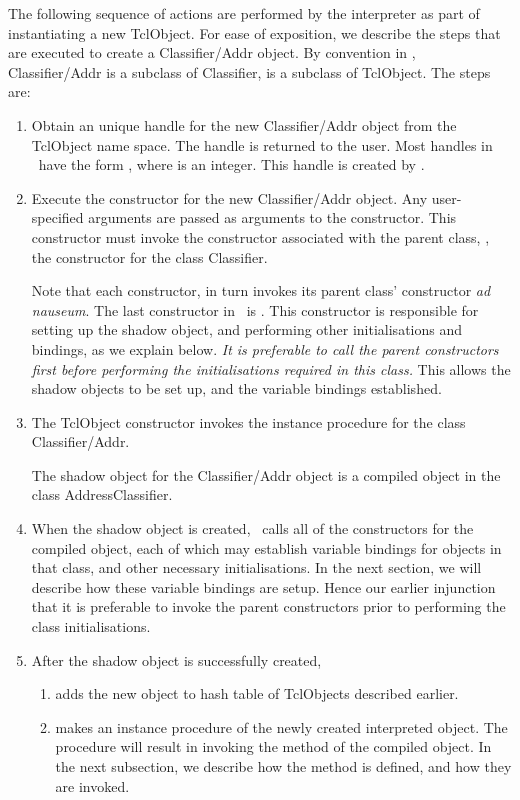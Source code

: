 \documentclass{article}
\begin{document}
The following sequence of actions are performed by the interpreter
as part of instantiating a new TclObject.
For ease of exposition, we describe the steps that are executed
to create a Classifier/Addr object.
By convention in \ns, Classifier/Addr is a subclass of Classifier, 
is a subclass of TclObject.
The steps are:
\begin{enumerate}
\item
  Obtain an unique handle for the new Classifier/Addr object
  from the TclObject name space.
  The handle is returned to the user.
  Most handles in \ns\ have the form , where 
  is an integer.  This handle is created by
  .
\item Execute the constructor for the new Classifier/Addr object.
  Any user-specified arguments are passed as arguments to the constructor.
  This constructor must invoke the constructor
  associated with the parent class,
  \ie, the constructor for the class Classifier.

  Note that each constructor,
  in turn invokes its parent class' constructor \textit{ad nauseum}.
  The last constructor in \ns\ is
  .
  This constructor is responsible for setting up the shadow object, and 
  performing other initialisations and bindings, as we explain below.
  \emph{It is preferable to call the parent constructors first before
    performing the initialisations required in this class.}
  This allows the shadow objects to be set up,
  and the variable bindings established.
\item The TclObject constructor invokes the instance procedure
   for the class Classifier/Addr.

  The shadow object for the Classifier/Addr object is
  a compiled object in the class AddressClassifier.
\item When the shadow object is created,
  \ns\ calls all of the constructors for the compiled object,
  each of which may establish variable bindings for objects in that class,
  and other necessary initialisations.
  In the next section, we will describe how these variable bindings are setup.
  Hence our earlier injunction that it is preferable to invoke the parent
  constructors prior to performing the class initialisations.
\item After the shadow object is successfully created,
  \begin{enumerate}
  \item adds the new object to hash table of TclObjects described earlier.
  \item makes  an instance procedure of the newly created
    interpreted object.
    The procedure will result in invoking the 
    method of the compiled object.
    In the next subsection, we describe how the 
    method is defined, and how they are invoked.
  \end{enumerate}
\end{enumerate}
\end{document}
